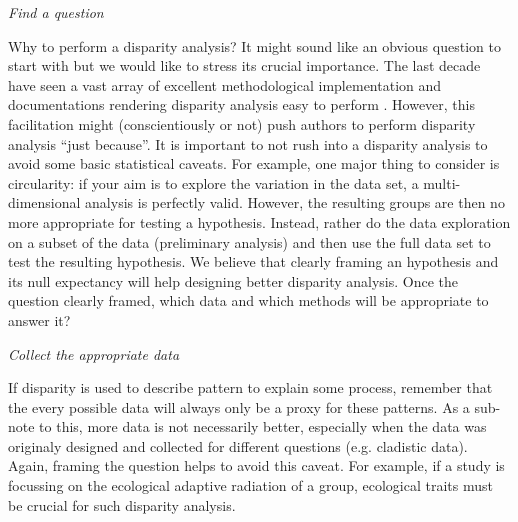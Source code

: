 \documentclass[12pt,letterpaper]{article}
\renewcommand{\subsection}[1]{%
\bigskip
\begin{center}
\begin{large}
\normalfont\itshape #1
\end{large}
\end{center}}
\begin{document}
\subsection{Find a question}
Why to perform a disparity analysis?
It might sound like an obvious question to start with but we would like to stress its crucial importance.
The last decade have seen a vast array of excellent methodological implementation and documentations rendering disparity analysis easy to perform \citep{bouxin2005ginkgo,oksanen2007vegan,geiger2008,zelditch2012geometric,adams2013geomorph,Claddis,dispRityv02,adams2017geometric}.
However, this facilitation might (conscientiously or not) push authors to perform disparity analysis ``just because''.
It is important to not rush into a disparity analysis to avoid some basic statistical caveats.
For example, one major thing to consider is circularity: if your aim is to explore the variation in the data set, a multi-dimensional analysis is perfectly valid.
However, the resulting groups are then no more appropriate for testing a hypothesis.
Instead, rather do the data exploration on a subset of the data (preliminary analysis) and then use the full data set to test the resulting hypothesis.
We believe that clearly framing an hypothesis and its null expectancy will help designing better disparity analysis.
Once the question clearly framed, which data and which methods will be appropriate to answer it?

\subsection{Collect the appropriate data}
If disparity is used to describe pattern to explain some process, remember that the every possible data will always only be a proxy for these patterns.
As a sub-note to this, more data is not necessarily better, especially when the data was originaly designed and collected for different questions (e.g. cladistic data).
Again, framing the question helps to avoid this caveat.
For example, if a study is focussing on the ecological adaptive radiation of a group, ecological traits must be crucial for such disparity analysis.
\end{document}
